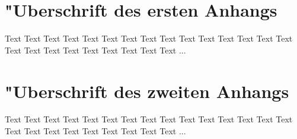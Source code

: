 \documentclass[a4paper,bibtotoc,oneside]{scrbook}
\begin{document}
\begin{appendix}
\chapter[Erster Anhang]{"Uberschrift des ersten Anhangs}

Text Text Text Text Text Text Text Text Text Text Text Text Text Text Text Text Text Text Text Text Text Text Text Text ...
 

\chapter[Zweiter Anhang]{"Uberschrift des zweiten Anhangs}

Text Text Text Text Text Text Text Text Text Text Text Text Text Text Text Text Text Text Text Text Text Text Text Text ...

\end{appendix}
\end{document}
